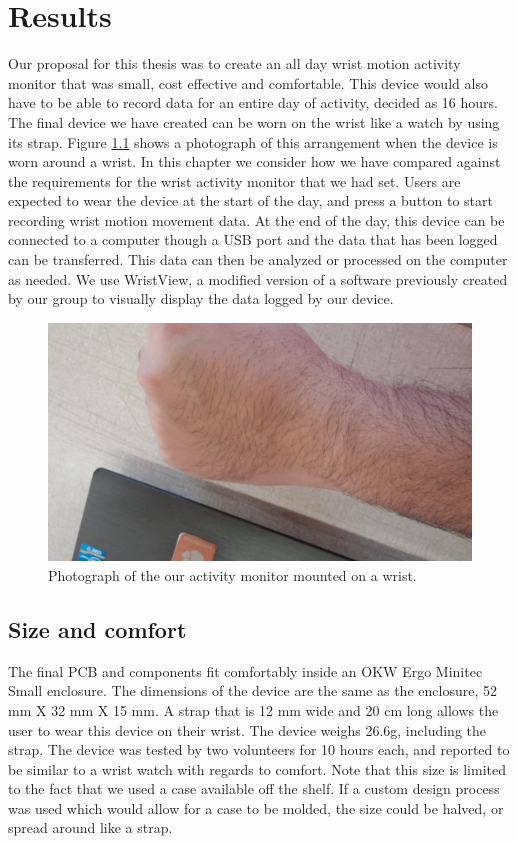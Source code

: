 \chapter{Results}
\label{Chap:Results}

Our proposal for this thesis was to create an all day wrist motion activity monitor
that was small, cost effective and comfortable.
This device would also have to be able to record data for an entire day of activity,
decided as 16 hours.
The final device we have created can be worn on the wrist like a watch by using its strap.
Figure \ref{Fig:WristPhoto} shows a photograph of this arrangement when the device is worn around a wrist.
In this chapter we consider how we have compared against the requirements for the wrist activity monitor that we had set.
Users are expected to wear the device at the start of the day,
and press a button to start recording wrist motion movement data.
At the end of the day,
this device can be connected to a computer though a USB port and the data that has been logged can be transferred.
This data can then be analyzed or processed on the computer as needed.
We use WristView, a modified version of a software previously created by our group to visually display the data logged by our device. 
\begin{figure}
\begin{center}
\includegraphics[width=\textwidth]{images/WristPhoto.jpg}
\caption{Photograph of the our activity monitor mounted on a wrist.}
\label{Fig:WristPhoto}
\end{center}
\end{figure}

\section{Size and comfort}
\label{Sec:ResultsSize}
The final PCB and components fit comfortably inside an OKW Ergo Minitec Small enclosure.
The dimensions of the device are the same as the enclosure,
52 mm X 32 mm X 15 mm.
A strap that is 12 mm wide and 20 cm long allows the user to wear this device on their wrist.
The device weighs 26.6g, including the strap.
The device was tested by two volunteers for 10 hours each,
and reported to be similar to a wrist watch with regards to comfort.
Note that this size is limited to the fact that we used a case available off the shelf.
If a custom design process was used which would allow for a case to be molded,
the size could be halved,
or spread around like a strap.

